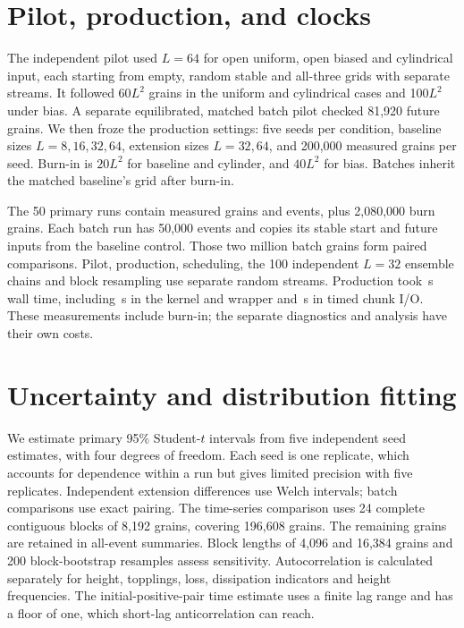 \section{Pilot, production, and clocks}\label{sec:design}
The independent pilot used $L=64$ for open uniform, open biased and cylindrical input, each starting from empty, random stable and all-three grids with separate streams. It followed 60$L^2$ grains in the uniform and cylindrical cases and 100$L^2$ under bias. A separate equilibrated, matched batch pilot checked 81,920 future grains. We then froze the production settings: five seeds per condition, baseline sizes $L=8,16,32,64$, extension sizes $L=32,64$, and 200,000 measured grains per seed. Burn-in is $20L^2$ for baseline and cylinder, and $40L^2$ for bias. Batches inherit the matched baseline's grid after burn-in.

The 50 primary runs contain  measured grains and  events, plus 2,080,000 burn grains. Each batch run has 50,000 events and copies its stable start and future inputs from the baseline control. Those two million batch grains form paired comparisons. Pilot, production, scheduling, the 100 independent $L=32$ ensemble chains and block resampling use separate random streams. Production took \,s wall time, including \,s in the kernel and wrapper and \,s in timed chunk I/O. These measurements include burn-in; the separate diagnostics and analysis have their own costs.

\section{Uncertainty and distribution fitting}\label{sec:statistics}
We estimate primary 95\% Student-$t$ intervals from five independent seed estimates, with four degrees of freedom. Each seed is one replicate, which accounts for dependence within a run but gives limited precision with five replicates. Independent extension differences use Welch intervals; batch comparisons use exact pairing. The time-series comparison uses 24 complete contiguous blocks of 8,192 grains, covering 196,608 grains. The remaining grains are retained in all-event summaries. Block lengths of 4,096 and 16,384 grains and 200 block-bootstrap resamples assess sensitivity. Autocorrelation is calculated separately for height, topplings, loss, dissipation indicators and height frequencies. The initial-positive-pair time estimate uses a finite lag range and has a floor of one, which short-lag anticorrelation can reach.

